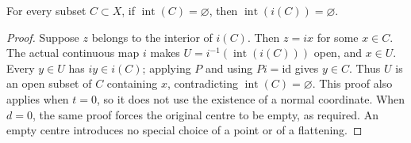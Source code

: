 \begin{lemma}
\label{hir:actual-zero-section-image-empty-interior}
\leanok
For every subset $C\subset X$, if $\operatorname{int}(C)=\varnothing$,
then $\operatorname{int}(i(C))=\varnothing$.
\end{lemma}
\begin{proof}
Suppose $z$ belongs to the interior of $i(C)$. Then $z=ix$ for some
$x\in C$. The actual continuous map $i$ makes
$U=i^{-1}(\operatorname{int}(i(C)))$ open, and $x\in U$.
Every $y\in U$ has $iy\in i(C)$; applying $P$ and using $Pi=\mathrm{id}$
gives $y\in C$. Thus $U$ is an open subset of $C$ containing $x$,
contradicting $\operatorname{int}(C)=\varnothing$.
This proof also applies when $t=0$, so it does not use the existence of
a normal coordinate. When $d=0$, the same proof forces the original
centre to be empty, as required. An empty centre introduces no special
choice of a point or of a flattening.
\end{proof}

